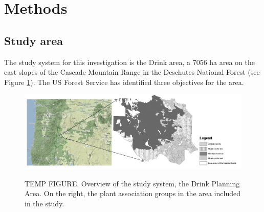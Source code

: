 \section{Methods}
\subsection{Study area}
The study system for this investigation is the Drink area, a 7056 ha area on the east slopes of the Cascade Mountain Range in the Deschutes National Forest (see Figure \ref{fig:drinkOverview}). The US Forest Service has identified three objectives for the area.
\begin{figure}
\centering
\includegraphics[width=.9\textwidth]{../images/drinkOverview}
\label{fig:drinkOverview}
\caption[Overview of the study system, the Drink Planning Area]{TEMP FIGURE. Overview of the study system, the Drink Planning Area. On the right, the plant association groups in the area included in the study.}
\end{figure}

